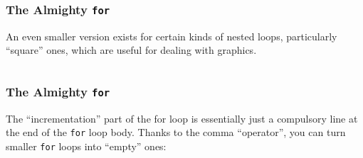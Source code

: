 \documentclass[xcolor]{beamer}
\begin{document}
\begin{frame}
	\frametitle{The Almighty \texttt{for}}
	\pause
	
	An even smaller version exists for certain kinds of nested loops, particularly ``square'' ones, which are useful for dealing with graphics.
	\pause
	
	\begin{columns}
		\begin{column}{0.45\textwidth}
			\centering
			
		\end{column}
		\pause
		\begin{column}{0.45\textwidth}
			\centering
			
		\end{column}
	\end{columns}
\end{frame}

\begin{frame}
	\frametitle{The Almighty \texttt{for}}
	\pause
	
	The ``incrementation'' part of the for loop is essentially just a compulsory line at the end of the \texttt{for} loop body. Thanks to the comma ``operator'', you can turn smaller \texttt{for} loops into ``empty'' ones:
	\pause
	
	\begin{columns}
		\begin{column}{0.45\textwidth}
			\centering
			
		\end{column}
		\pause
		\begin{column}{0.45\textwidth}
			\centering
			
		\end{column}
	\end{columns}
\end{frame}
\end{document}
